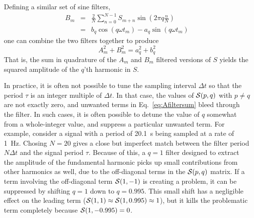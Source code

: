 \documentclass{revtex4}
\begin{document}
Defining a similar set of sine filters,
\begin{eqnarray}
B_m&=&\frac{2}{N}\sum_{n=0}^{N-1}{S_{m+n}\sin\left(2\pi q\frac{n}{N}\right)}
\nonumber\\
&=& b_q\cos(q\omega t_m)-a_q\sin(q\omega t_m)
\label{eq:Bfilterdef}
\end{eqnarray}
one can combine the two filters together to produce
\begin{equation}
A_m^2+B_m^2=a_q^2+b_q^2
\end{equation}
That is, the sum in quadrature of the $A_m$ and $B_m$ filtered versions
of $S$ yields the squared amplitude of the $q$'th harmonic in $S$.

In practice, it is often not possible to tune the sampling interval
$\Delta t$ so that the period $\tau$ is an integer multiple of $\Delta t$.
In that case, the values of ${\cal S}(p,q)$ with $p\ne q$ are not exactly
zero, and unwanted terms in Eq.~\ref{eq:Afiltersum} bleed through the filter.
In such cases, it is often possible to detune the value of $q$ somewhat
from a whole-integer value, and suppress a particular unwanted term.
For example, consider a signal with a period of 20.1~s being sampled at
a rate of 1~Hz.  Chosing $N=20$ gives a close but imperfect match between
the filter period $N\Delta t$ and the signal period $\tau$.  Because of
this, a $q=1$ filter designed to extract the amplitude of the fundamental
harmonic picks up small contributions from other harmonics as well, due
to the off-diagonal terms in the ${\cal S}(p,q)$ matrix.  If a term
involving the off-diagonal term ${\cal S}(1,-1)$ is creating a problem,
it can be suppressed by shifting $q=1$ down to $q=0.995$.  This small
shift has a negligible effect on the leading term 
(${\cal S}(1,1)\approx {\cal S}(1,0.995)\approx 1$), but it kills the
problematic term completely because ${\cal S}(1,-0.995)=0$. 
\end{document}
